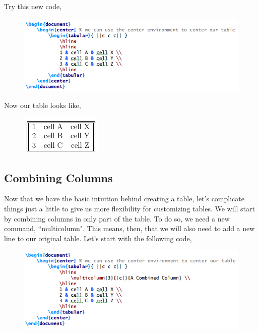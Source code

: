 \documentclass[11pt]{article}
\newcommand{\forceindent}{\leavevmode{\parindent=1.5em\indent}} %
\begin{document}
Try this new code, 

\begin{figure}[!h]
	\includegraphics[scale=.5]{CODE2} \\ %
\end{figure}

Now our table looks like,

\begin{figure}[!h]
	\includegraphics[scale=.6]{OUT2} \\ %
	\centering
\end{figure}

\subsection{Combining Columns}

\forceindent Now that we have the basic intuition behind creating a table, let's complicate things just a little to give us more flexibility for customizing tables. We will start by combining columns in only part of the table. To do so, we need a new command, ``multicolumn". This means, then, that we will also need to add a new line to our original table. Let's start with the following code,

\begin{figure}[!h]
	\includegraphics[scale=.5]{CODE3} \\ %
\end{figure}
\end{document}
